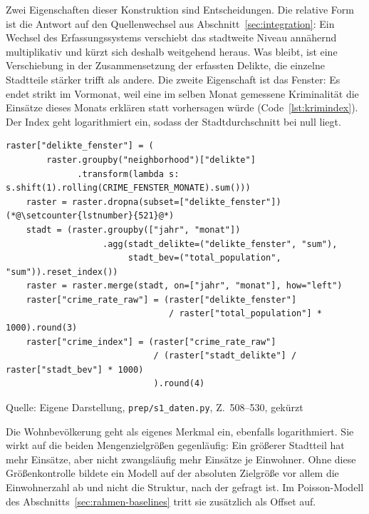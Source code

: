 \documentclass[12pt,a4paper]{article}
\newcommand{\tabquelle}[1][Eigene Darstellung]{%
  \par\setlength{\parskip}{0pt}\vspace{3pt}%
  {\setstretch{1}\fontsize{9pt}{11pt}\selectfont\raggedright Quelle: #1\par}%
}
\begin{document}
Zwei Eigenschaften dieser Konstruktion sind Entscheidungen. Die relative Form
ist die Antwort auf den Quellenwechsel aus Abschnitt~\ref{sec:integration}: Ein
Wechsel des Erfassungssystems verschiebt das stadtweite Niveau annähernd
multiplikativ und kürzt sich deshalb weitgehend heraus. Was bleibt, ist eine
Verschiebung in der Zusammensetzung der erfassten Delikte, die einzelne
Stadtteile stärker trifft als andere. Die zweite Eigenschaft ist das Fenster:
Es endet strikt im Vormonat, weil eine im selben Monat gemessene Kriminalität
die Einsätze dieses Monats erklären statt vorhersagen würde
(Code~\ref{lst:krimindex}). Der Index geht logarithmiert ein, sodass der
Stadtdurchschnitt bei null liegt.
 
\begin{quellcode}[htbp]
\caption{Relativer Kriminalitätsindex je Stadtteil und Monat}
\label{lst:krimindex}\vspace{-3.5pt}
\begin{lstlisting}[style=pythonstil,firstnumber=508]
    raster["delikte_fenster"] = (
        raster.groupby("neighborhood")["delikte"]
              .transform(lambda s: s.shift(1).rolling(CRIME_FENSTER_MONATE).sum()))
    raster = raster.dropna(subset=["delikte_fenster"])(*@\setcounter{lstnumber}{521}@*)
    stadt = (raster.groupby(["jahr", "monat"])
                   .agg(stadt_delikte=("delikte_fenster", "sum"),
                        stadt_bev=("total_population", "sum")).reset_index())
    raster = raster.merge(stadt, on=["jahr", "monat"], how="left")
    raster["crime_rate_raw"] = (raster["delikte_fenster"]
                                / raster["total_population"] * 1000).round(3)
    raster["crime_index"] = (raster["crime_rate_raw"]
                             / (raster["stadt_delikte"] / raster["stadt_bev"] * 1000)
                             ).round(4)
\end{lstlisting}
\tabquelle[Eigene Darstellung, \texttt{prep/s1\_daten.py}, Z.~508--530, gekürzt]
\end{quellcode}
 
Die Wohnbevölkerung geht als eigenes Merkmal ein, ebenfalls logarithmiert. Sie
wirkt auf die beiden Mengenzielgrößen gegenläufig: Ein größerer Stadtteil hat
mehr Einsätze, aber nicht zwangsläufig mehr Einsätze je Einwohner. Ohne diese
Größenkontrolle bildete ein Modell auf der absoluten Zielgröße vor allem die
Einwohnerzahl ab und nicht die Struktur, nach der gefragt ist. Im
Poisson-Modell des Abschnitts~\ref{sec:rahmen-baselines} tritt sie zusätzlich
als Offset auf.
 
\end{document}
